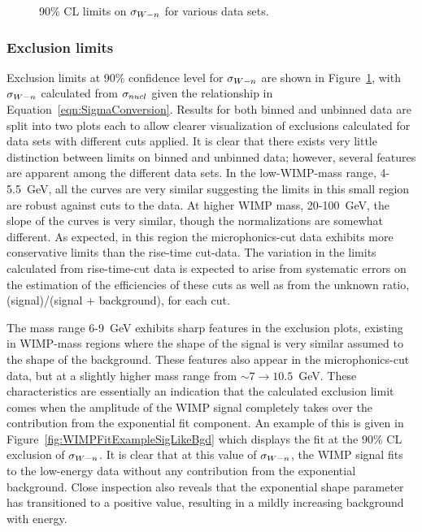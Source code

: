 			\begin{sidewaysfigure}
				\centering
				\caption[90\% CL limits on $\sigman$ for various data sets]
				{90\% CL limits on $\sigman$ for various data sets.}
				\label{fig:UnconstrainedLimits}
			\end{sidewaysfigure}			
			
			\subsubsection{Exclusion limits}	
Exclusion limits at 90\% confidence level for $\sigman$ are shown in Figure~\ref{fig:UnconstrainedLimits}, with $\sigman$ calculated from $\sigma_{nucl}$ given the relationship in Equation~\ref{eqn:SigmaConversion}.  Results for both binned and unbinned data are split into two plots each to allow clearer visualization of exclusions calculated for data sets with different cuts applied.  
It is clear that there exists very little distinction between limits on binned and unbinned data; however, several features are apparent among the different data sets.  In the low-WIMP-mass range, 4-5.5~GeV, all the curves are very similar suggesting the limits in this small region are robust against cuts to the data.  At higher WIMP mass, 20-100~GeV, the slope of the curves is very similar, though the normalizations are somewhat different.  As expected, in this region the microphonics-cut data exhibits more conservative limits than the rise-time cut-data.  The variation in the limits calculated from rise-time-cut data is expected to arise from systematic errors on the estimation of the efficiencies of these cuts as well as from the unknown ratio, (signal)/(signal + background), for each cut.  

The mass range 6-9~GeV exhibits sharp features in the exclusion plots, existing in WIMP-mass regions where the shape of the signal is very similar assumed to the shape of the background.  These features also appear in the microphonics-cut data, but at a slightly higher mass range from $\sim7\to10.5$~GeV.  These characteristics are essentially an indication that the calculated exclusion limit comes when the amplitude of the WIMP signal completely takes over the contribution from the exponential fit component.  An example of this is given in Figure~\ref{fig:WIMPFitExampleSigLikeBgd} which displays the fit at the 90\% CL exclusion of $\sigman$.  It is clear that at this value of $\sigman$, the WIMP signal fits to the low-energy data without any contribution from the exponential background.  Close inspection also reveals that the exponential shape parameter has transitioned to a positive value, resulting in a mildly increasing background with energy.  

